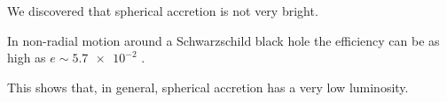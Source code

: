 \documentclass[main.tex]{subfiles}
\begin{document}
We discovered that spherical accretion is not very bright.

In non-radial motion around a Schwarzschild black hole the efficiency can be as high as \(e \sim \num{5.7e-2}\) \cite[eq. 2.8.5]{Nobili:2000}.

This shows that, in general, spherical accretion has a very low luminosity.
\end{document}
